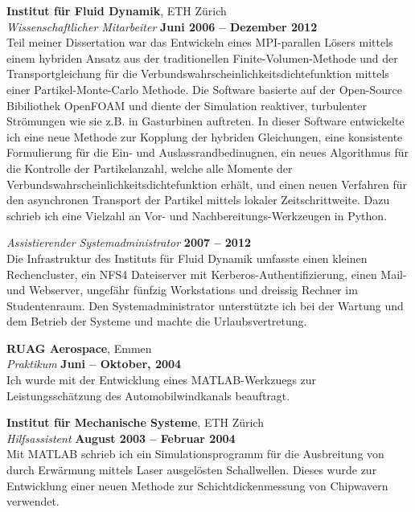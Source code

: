 \documentclass[line,11pt,a4paper]{../resume}
\begin{document}
\begin{resume}
\textbf{Institut f\"ur Fluid Dynamik}, ETH Z\"urich \vspace{2mm}\\\vspace{1mm}%
\textsl{Wissenschaftlicher Mitarbeiter} \hfill \textbf{Juni 2006 -- Dezember 2012}\\
Teil meiner Dissertation war das Entwickeln eines MPI-parallen L\"osers mittels
einem hybriden Ansatz aus der traditionellen Finite-Volumen-Methode und der
Transportgleichung f\"ur die Verbundswahrscheinlichkeitsdichtefunktion mittels
einer Partikel-Monte-Carlo Methode. Die Software basierte auf der Open-Source
Bibiliothek OpenFOAM und diente der Simulation reaktiver, turbulenter
Str\"omungen wie sie z.B. in Gasturbinen auftreten. In dieser Software
entwickelte ich eine neue Methode zur Kopplung der hybriden Gleichungen, eine
konsistente Formulierung f\"ur die Ein- und Auslassrandbedinugnen, ein neues
Algorithmus f\"ur die Kontrolle der Partikelanzahl, welche alle Momente der
Verbundswahrscheinlichkeitsdichtefunktion erh\"alt, und einen neuen Verfahren
f\"ur den asynchronen Transport der Partikel mittels lokaler Zeitschrittweite.
Dazu schrieb ich eine Vielzahl an Vor- und Nachbereitungs-Werkzeugen in
Python.

\textsl{Assistierender Systemadministrator} \hfill \textbf{2007 -- 2012}\\
Die Infrastruktur des Instituts f\"ur Fluid Dynamik umfasste einen kleinen
Rechencluster, ein NFS4 Dateiserver mit Kerberos-Authentifizierung, einen
Mail- und Webserver, ungef\"ahr f\"unfzig Workstations und dreissig Rechner
im Studentenraum. Den Systemadministrator unterst\"utzte ich bei der
Wartung und dem Betrieb der Systeme und machte die Urlaubsvertretung.

\textbf{RUAG Aerospace}, Emmen \vspace{2mm}\\\vspace{1mm}%
\textsl{Praktikum} \hfill \textbf{Juni -- Oktober, 2004}\\
Ich wurde mit der Entwicklung eines MATLAB-Werkzuegs zur Leistungssch\"atzung
des Automobilwindkanals beauftragt.

\textbf{Institut f\"ur Mechanische Systeme}, ETH Z\"urich \vspace{2mm}\\\vspace{1mm}%
\textsl{Hilfsassistent} \hfill \textbf{August 2003 -- Februar 2004}\\
Mit MATLAB schrieb ich ein Simulationsprogramm f\"ur die Ausbreitung von
durch Erw\"armung mittels Laser ausgel\"osten Schallwellen. Dieses wurde zur
Entwicklung einer neuen Methode zur Schichtdickenmessung von Chipwavern
verwendet.


\end{resume}
\end{document}
